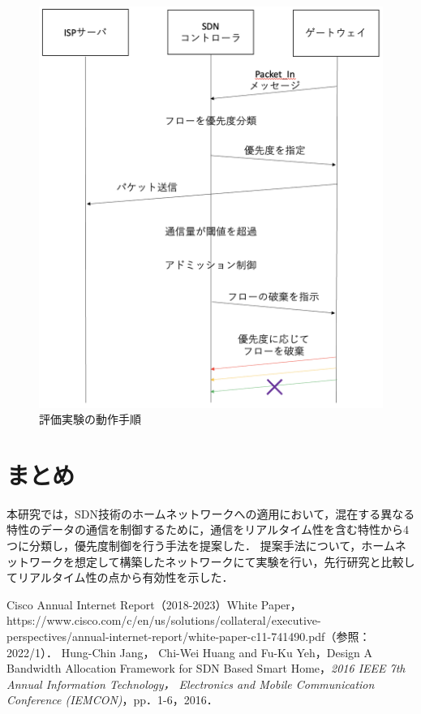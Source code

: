 \documentclass[a4paper,10pt,twocolumn,uplatex]{jsarticle}
\begin{document}
\begin{figure}[t]
	\begin{centering}
    \includegraphics[width=0.8 \linewidth]{img/sequence.png}
    \caption{評価実験の動作手順}
    \label{tab:sequence}
    \end{centering}
\end{figure}

\section{まとめ}
本研究では，SDN技術のホームネットワークへの適用において，混在する異なる特性のデータの通信を制御するために，通信をリアルタイム性を含む特性から4つに分類し，優先度制御を行う手法を提案した．
提案手法について，ホームネットワークを想定して構築したネットワークにて実験を行い，先行研究と比較してリアルタイム性の点から有効性を示した．

\footnotesize{
  \begin{thebibliography}{99}
     Cisco Annual Internet Report（2018-2023）White Paper，https://www.cisco.com/c/en/us/solutions/collateral/executive-perspectives/annual-internet-report/white-paper-c11-741490.pdf（参照：2022/1）．
     Hung-Chin Jang， Chi-Wei Huang and Fu-Ku Yeh，Design A Bandwidth Allocation Framework for SDN Based Smart Home，\textit{2016 IEEE 7th Annual Information Technology， Electronics and Mobile Communication Conference (IEMCON)}，pp．1-6，2016．
  \end{thebibliography}
}

% 
% 

\end{document}
